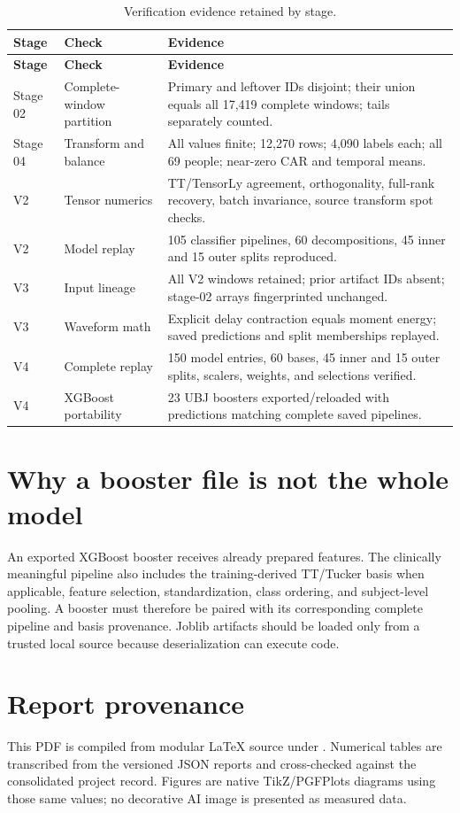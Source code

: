 \begin{longtable}{p{}p{}p{}}
\caption{Verification evidence retained by stage.}
\label{tab:verification}\\
\toprule
\textbf{Stage} & \textbf{Check} & \textbf{Evidence}\\
\midrule
\endfirsthead
\toprule
\textbf{Stage} & \textbf{Check} & \textbf{Evidence}\\
\midrule
\endhead
Stage 02 & Complete-window partition & Primary and leftover IDs disjoint; their union equals all 17,419 complete windows; tails separately counted.\\
Stage 04 & Transform and balance & All values finite; 12,270 rows; 4,090 labels each; all 69 people; near-zero CAR and temporal means.\\
V2 & Tensor numerics & TT/TensorLy agreement, orthogonality, full-rank recovery, batch invariance, source transform spot checks.\\
V2 & Model replay & 105 classifier pipelines, 60 decompositions, 45 inner and 15 outer splits reproduced.\\
V3 & Input lineage & All V2 windows retained; prior artifact IDs absent; stage-02 arrays fingerprinted unchanged.\\
V3 & Waveform math & Explicit delay contraction equals moment energy; saved predictions and split memberships replayed.\\
V4 & Complete replay & 150 model entries, 60 bases, 45 inner and 15 outer splits, scalers, weights, and selections verified.\\
V4 & XGBoost portability & 23 UBJ boosters exported/reloaded with predictions matching complete saved pipelines.\\
\bottomrule
\end{longtable}

\section{Why a booster file is not the whole model}

An exported XGBoost booster receives already prepared features. The clinically
meaningful pipeline also includes the training-derived TT/Tucker basis when
applicable, feature selection, standardization, class ordering, and subject-level
pooling. A booster must therefore be paired with its corresponding complete
pipeline and basis provenance. Joblib artifacts should be loaded only from a
trusted local source because deserialization can execute code.

\section{Report provenance}

This PDF is compiled from modular LaTeX source under
. Numerical tables are transcribed from the versioned
JSON reports and cross-checked against the consolidated project record. Figures
are native TikZ/PGFPlots diagrams using those same values; no decorative AI
image is presented as measured data.

